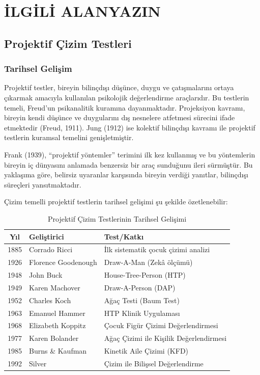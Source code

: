 
\chapter{İLGİLİ ALANYAZIN}

\section{Projektif Çizim Testleri}

\subsection{Tarihsel Gelişim}

Projektif testler, bireyin bilinçdışı düşünce, duygu ve çatışmalarını ortaya çıkarmak amacıyla kullanılan psikolojik değerlendirme araçlarıdır. Bu testlerin temeli, Freud'un psikanalitik kuramına dayanmaktadır. Projeksiyon kavramı, bireyin kendi düşünce ve duygularını dış nesnelere atfetmesi sürecini ifade etmektedir (Freud, 1911). Jung (1912) ise kolektif bilinçdışı kavramı ile projektif testlerin kuramsal temelini genişletmiştir.

Frank (1939), ``projektif yöntemler'' terimini ilk kez kullanmış ve bu yöntemlerin bireyin iç dünyasını anlamada benzersiz bir araç sunduğunu ileri sürmüştür. Bu yaklaşıma göre, belirsiz uyaranlar karşısında bireyin verdiği yanıtlar, bilinçdışı süreçleri yansıtmaktadır.

Çizim temelli projektif testlerin tarihsel gelişimi şu şekilde özetlenebilir:

\begin{table}[H]
\centering
\caption{Projektif Çizim Testlerinin Tarihsel Gelişimi}
\label{tab:tarihi}
\begin{tabular}{cll}
\toprule
\textbf{Yıl} & \textbf{Geliştirici} & \textbf{Test/Katkı} \\
\midrule
1885 & Corrado Ricci & İlk sistematik çocuk çizimi analizi \\
1926 & Florence Goodenough & Draw-A-Man (Zekâ ölçümü) \\
1948 & John Buck & House-Tree-Person (HTP) \\
1949 & Karen Machover & Draw-A-Person (DAP) \\
1952 & Charles Koch & Ağaç Testi (Baum Test) \\
1963 & Emanuel Hammer & HTP Klinik Uygulaması \\
1968 & Elizabeth Koppitz & Çocuk Figür Çizimi Değerlendirmesi \\
1977 & Karen Bolander & Ağaç Çizimi ile Kişilik Değerlendirmesi \\
1985 & Burns \& Kaufman & Kinetik Aile Çizimi (KFD) \\
1992 & Silver & Çizim ile Bilişsel Değerlendirme \\
\bottomrule
\end{tabular}
\end{table}

